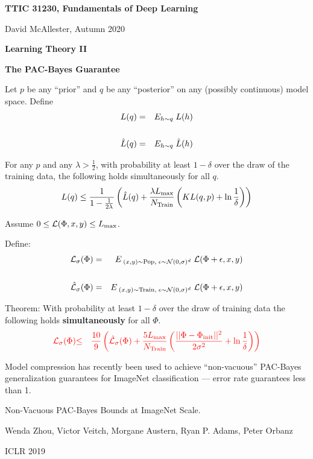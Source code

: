 




{\Huge


\centerline{\bf TTIC 31230, Fundamentals of Deep Learning}
\bigskip
\centerline{David McAllester, Autumn 2020}

\vfill
\centerline{\bf Learning Theory II}
\vfill
\vfill
\centerline{\bf The PAC-Bayes Guarantee}

\vfill
\vfill


Let $p$ be any ``prior'' and $q$ be any ``posterior'' on any  (possibly continuous) model space.
Define
\begin{eqnarray*}
  L(q) & =  &E_{h \sim q}\;L(h) \\
  \\
  \hat{L}(q) & =  &E_{h \sim q}\;\hat{L}(h)
\end{eqnarray*}


\vfill
For any $p$ and any $\lambda > \frac{1}{2}$, with probability
at least $1-\delta$ over the draw of the training data, the following holds simultaneously for all $q$.
\vfill
$$L(q) \leq \frac{1}{1-\frac{1}{2\lambda}}\left(\hat{L}(q) + \frac{\lambda L_{\max}}{N_\mathrm{Train}}\left(KL(q,p) + \ln \frac{1}{\delta}\right)\right)$$


Assume $0 \leq {\cal L}(\Phi,x,y) \leq L_{\max}$.

\vfill
Define:
\begin{eqnarray*}
{\cal L}_\sigma(\Phi) & = & E_{\;(x,y)\sim \mathrm{Pop},\;\epsilon \sim {\cal N}(0,\sigma)^d}\;{{\cal L}(\Phi+\epsilon,x,y)} \\
\\
\hat{{\cal L}}_\sigma(\Phi) & = & E_{\;(x,y)\sim \mathrm{Train},\;\epsilon \sim {\cal N}(0,\sigma)^d}\;{{\cal L}(\Phi+\epsilon,x,y)} \\
\end{eqnarray*}

\vfill
Theorem: With probability at least $1-\delta$ over the draw of training data the following holds {\bf simultaneously} for all $\Phi$.
\begin{eqnarray*}
   {\color{red} {\cal L}_\sigma(\Phi)} & {\color{red} \leq} & {\color{red} \frac{10}{9}\left(\hat{{\cal L}}_\sigma(\Phi)
   + \frac{5 L_{\max}}{N_\mathrm{Train}}\left(\frac{||\Phi-\Phi_{\mathrm{init}}||^2}{2\sigma^2} + \ln \frac{1}{\delta}\right)\right)}
\end{eqnarray*}


Model compression has recently been used to achieve ``non-vacuous'' PAC-Bayes generalization guarantees for ImageNet classification
--- error rate guarantees less than 1.

\vfill
Non-Vacuous PAC-Bayes Bounds at ImageNet Scale.

\bigskip
Wenda Zhou, Victor Veitch, Morgane Austern, Ryan P. Adams, Peter Orbanz

\bigskip
ICLR 2019


}

